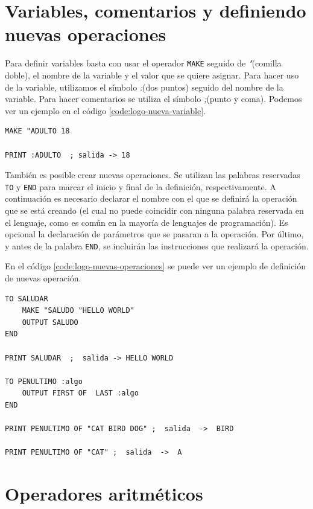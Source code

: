 \section*{Variables, comentarios y definiendo nuevas operaciones}
\label{sec:logo-variables}

Para definir variables basta con usar el operador \texttt{MAKE} seguido de \emph{"}(comilla doble), el nombre de la variable y el valor que se quiere asignar. Para hacer uso de la variable, utilizamos el símbolo \emph{:}(dos puntos) seguido del nombre de la variable. Para hacer comentarios se utiliza el símbolo \emph{;}(punto y coma). Podemos ver un ejemplo en el código \ref{code:logo-nueva-variable}.

\begin{lstlisting}[language={Logo}, label={code:logo-nueva-variable}, caption={Ejemplo de definición de nuevas variables en el lenguaje Logo.}]
MAKE "ADULTO 18

PRINT :ADULTO  ; salida -> 18
\end{lstlisting}

También es posible crear nuevas operaciones. Se utilizan las palabras reservadas \texttt{TO} y \texttt{END} para marcar el inicio y final de la definición, respectivamente. A continuación es necesario declarar el nombre con el que se definirá la operación que se está creando (el cual no puede coincidir con ninguna palabra reservada en el lenguaje, como es común en la mayoría de lenguajes de programación). Es opcional la declaración de parámetros que se pasaran a la operación. Por último, y antes de la palabra \texttt{END}, se incluirán las instrucciones que realizará la operación.

En el código \ref{code:logo-nuevas-operaciones} se puede ver un ejemplo de definición de nuevas operación.

\begin{lstlisting}[language={Logo}, label={code:logo-nuevas-operaciones}, caption={Definición de nuevas operaciones en el lenguaje Logo.}]
TO SALUDAR
	MAKE "SALUDO "HELLO WORLD"
	OUTPUT SALUDO
END

PRINT SALUDAR  ;  salida -> HELLO WORLD

TO PENULTIMO :algo
	OUTPUT FIRST OF  LAST :algo
END

PRINT PENULTIMO OF "CAT BIRD DOG" ;  salida  ->  BIRD

PRINT PENULTIMO OF "CAT" ;  salida  ->  A
\end{lstlisting}


\section*{Operadores aritméticos}

